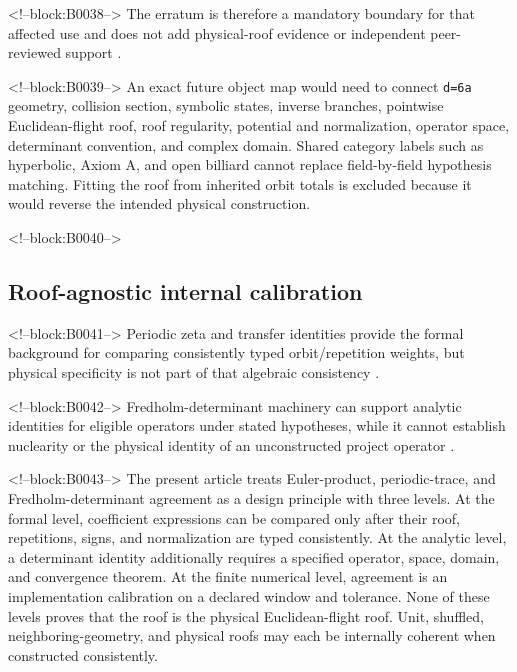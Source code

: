 \documentclass[11pt,a4paper]{article}
\begin{document}
<!--block:B0038-->
The erratum is therefore a mandatory boundary for that affected use and does not add physical-roof evidence or independent peer-reviewed support
\citep{P30-S18}.

<!--block:B0039-->
An exact future object map would need to connect \texttt{d=6a} geometry, collision section, symbolic states, inverse branches, pointwise Euclidean-flight roof, roof regularity, potential and normalization, operator space, determinant convention, and complex domain. Shared category labels such as hyperbolic, Axiom A, and open billiard cannot replace field-by-field hypothesis matching. Fitting the roof from inherited orbit totals is excluded because it would reverse the intended physical construction.

<!--block:B0040-->
\subsection{Roof-agnostic internal calibration}

<!--block:B0041-->
Periodic zeta and transfer identities provide the formal background for comparing consistently typed orbit/repetition weights, but physical specificity is not part of that algebraic consistency
\citep{P30-S13}.

<!--block:B0042-->
Fredholm-determinant machinery can support analytic identities for eligible operators under stated hypotheses, while it cannot establish nuclearity or the physical identity of an unconstructed project operator
\citep{P30-S14}.

<!--block:B0043-->
The present article treats Euler-product, periodic-trace, and Fredholm-determinant agreement as a design principle with three levels. At the formal level, coefficient expressions can be compared only after their roof, repetitions, signs, and normalization are typed consistently. At the analytic level, a determinant identity additionally requires a specified operator, space, domain, and convergence theorem. At the finite numerical level, agreement is an implementation calibration on a declared window and tolerance. None of these levels proves that the roof is the physical Euclidean-flight roof. Unit, shuffled, neighboring-geometry, and physical roofs may each be internally coherent when constructed consistently.
\end{document}
